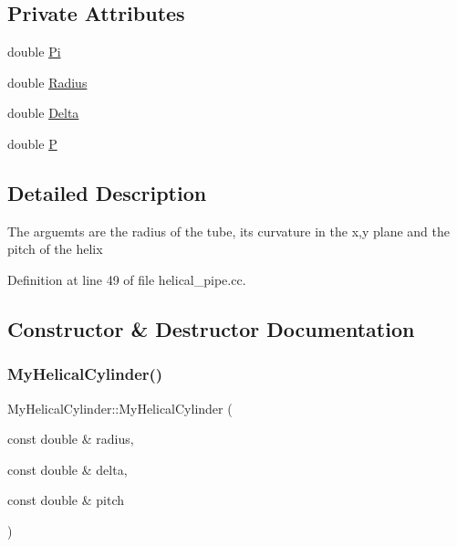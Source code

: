 \subsection*{Private Attributes}
\begin{DoxyCompactItemize}
\item 
double \hyperlink{classMyHelicalCylinder_a15daea10a805c0564e89a1bf48fa964b}{Pi}
\item 
double \hyperlink{classMyHelicalCylinder_af199ebf44d8ebb0dfbad5c0dadfff2a6}{Radius}
\item 
double \hyperlink{classMyHelicalCylinder_a104c0949848d76adefb15d050853c5f0}{Delta}
\item 
double \hyperlink{classMyHelicalCylinder_a65f84ee526f6ff7fb20d6eb1f04e0bc7}{P}
\end{DoxyCompactItemize}


\subsection{Detailed Description}
The arguemts are the radius of the tube, its curvature in the x,y plane and the pitch of the helix 

Definition at line 49 of file helical\+\_\+pipe.\+cc.



\subsection{Constructor \& Destructor Documentation}
\mbox{\label{classMyHelicalCylinder_a2ed054a7b461d0dabd5c35a59f7aefb3}} 
\subsubsection{\texorpdfstring{My\+Helical\+Cylinder()}{MyHelicalCylinder()}}
{\footnotesize\ttfamily My\+Helical\+Cylinder\+::\+My\+Helical\+Cylinder (\begin{DoxyParamCaption}\item[{const double \&}]{radius,  }\item[{const double \&}]{delta,  }\item[{const double \&}]{pitch }\end{DoxyParamCaption})\hspace{0.3cm}{\ttfamily [inline]}}



